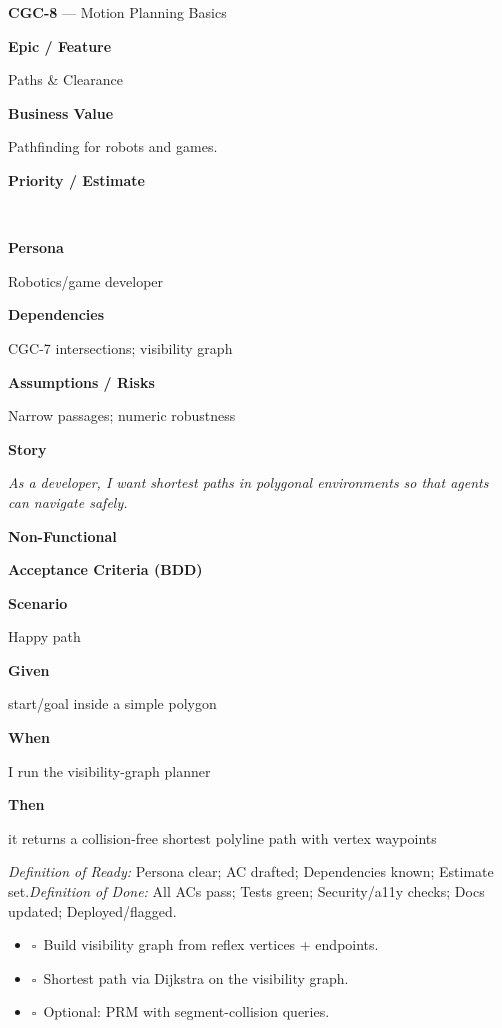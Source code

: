 \documentclass[11pt,a4paper]{article}
\newcommand{\MetaRow}[2]{%
  \noindent\begin{minipage}[t]{0.24\linewidth}\raggedleft\bfseries #1\end{minipage}%
  \hspace{0.8em}%
  \begin{minipage}[t]{0.72\linewidth}\raggedright #2\end{minipage}\par\vspace{0.3em}}
\newcommand{\CBox}{\(\square\)}
\newcommand{\BDDRow}[2]{\MetaRow{#1}{#2}}
\newenvironment{BDD}{\par\medskip}{\par\medskip}
\newcommand{\StoryTitle}[2]{\textbf{#1} --- #2}
\newcommand{\DoR}{\textit{Definition of Ready:} Persona clear; AC drafted; Dependencies known; Estimate set.}
\newcommand{\DoD}{\textit{Definition of Done:} All ACs pass; Tests green; Security/a11y checks; Docs updated; Deployed/flagged.}
\begin{document}
\begin{StoryCard}{\StoryTitle{CGC-8}{Motion Planning Basics}}
\MetaRow{Epic / Feature}{Paths \& Clearance}
\MetaRow{Business Value}{Pathfinding for robots and games.}
\MetaRow{Priority / Estimate}{\ \ \Badge{SP: 5}}
\MetaRow{Persona}{Robotics/game developer}
\MetaRow{Dependencies}{CGC-7 intersections; visibility graph}
\MetaRow{Assumptions / Risks}{Narrow passages; numeric robustness}
\MetaRow{Story}{\emph{As a developer, I want shortest paths in polygonal environments so that agents can navigate safely.}}

\medskip
\noindent\textbf{Non-Functional}\quad
{}\ \ 

\medskip
\noindent\textbf{Acceptance Criteria (BDD)}
\begin{BDD}
\BDDRow{Scenario}{Happy path}
\BDDRow{Given}{start/goal inside a simple polygon}
\BDDRow{When}{I run the visibility-graph planner}
\BDDRow{Then}{it returns a collision-free shortest polyline path with vertex waypoints}
\end{BDD}

\medskip
{\footnotesize \DoR\quad\textbullet\quad \DoD}
\end{StoryCard}

\begin{TaskBox}
\begin{itemize}
  \item \CBox\ Build visibility graph from reflex vertices + endpoints.
  \item \CBox\ Shortest path via Dijkstra on the visibility graph.
  \item \CBox\ Optional: PRM with segment-collision queries.
\end{itemize}
\end{TaskBox}

\clearpage
\end{document}
